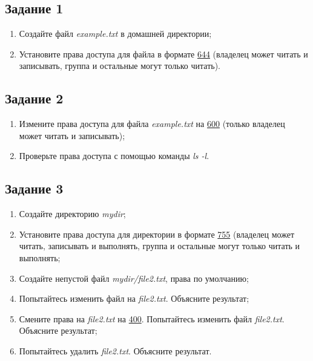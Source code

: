 \documentclass[12pt, a4paper]{report}
\begin{document}
	\subsection*{Задание 1}
	\begin{enumerate}
		\item Создайте файл \textit{example.txt} в домашней директории;
		\item Установите права доступа для файла в формате \underline{644} (владелец может читать и записывать, группа и остальные могут только читать).
	\end{enumerate}
	\lstset{style=mystyle}
	

	\subsection*{Задание 2}
	\begin{enumerate}
		\item Измените права доступа для файла \textit{example.txt} на \underline{600} (только владелец может читать и записывать);
		\item Проверьте права доступа с помощью команды \textit{ls -l}.
	\end{enumerate}
	\lstset{style=mystyle}
	

	\subsection*{Задание 3}
	\begin{enumerate}
		\item Создайте директорию \textit{mydir};
		\item Установите права доступа для директории в формате \underline{755} (владелец может читать, записывать и выполнять, группа и остальные могут только читать и выполнять;
		\item Создайте непустой файл \textit{mydir/file2.txt}, права по умолчанию;
		\item Попытайтесь изменить файл на \textit{file2.txt}. Объясните результат;
		\item Смените права на \textit{file2.txt} на \underline{400}. Попытайтесь изменить файл \textit{file2.txt}. Объясните результат;
		\item Попытайтесь удалить \textit{file2.txt}. Объясните результат.
	\end{enumerate}
	\lstset{style=mystyle}
	
\end{document}
